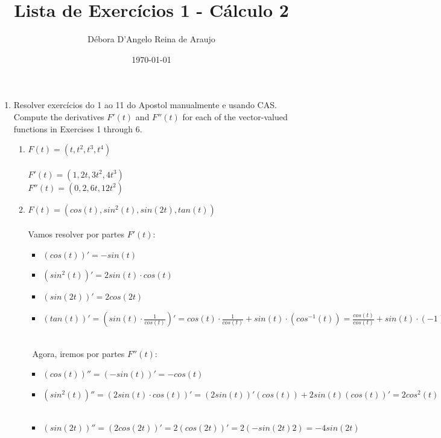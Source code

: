 \documentclass{article}
\begin{document}
\title{Lista de Exercícios 1 - Cálculo 2}
\author{Débora D'Angelo Reina de Araujo}
\date{\today}

\maketitle

\begin{enumerate}
    \item Resolver exercícios do 1 ao 11 do Apostol manualmente e usando CAS. \\
    Compute the derivatives $F'(t)$ and $F''(t)$ for each of the vector-valued functions in Exercises 1 through 6. \
        \begin{enumerate}[label=1.\arabic*.]
            \item $F(t) = (t, t^2, t^3, t^4)$ \\
                \\
                $F'(t) = (1, 2t, 3t^2, 4t^3)$ \\
                $F''(t) = (0, 2, 6t, 12t^2)$ \\
            \item $F(t) = (cos(t), sin^2(t), sin(2t), tan(t))$ \\
                \\
                Vamos resolver por partes $F'(t)$: \
                \begin{itemize}
                    \item $(cos(t))' = -sin(t)$ \
                    \item $(sin^2(t))'= 2sin(t) \cdot cos(t)$ \
                    \item $(sin(2t))' = 2cos(2t)$ \
                    \item $(tan(t))' = (sin(t) \cdot \frac{1}{cos(t)})' = cos(t) \cdot \frac{1}{cos(t)} + sin(t) \cdot (cos^{-1}(t)) = \frac{cos(t)}{cos(t)} + sin(t) \cdot (-1)(cos^{-2}(t))(-sin(t)) = \frac{cos^2(t)}{cos^2(t)} + \frac{sin^2(t)}{cos^2(t)} = \frac{1}{cos^2(t)} = sec^2(t) $ \
                \end{itemize} \
                Agora, iremos por partes $F''(t)$: \
                \begin{itemize}
                    \item $(cos(t))'' = (-sin(t))' = -cos(t)$ \
                    \item $(sin^2(t))''= (2sin(t) \cdot cos(t))' = (2sin(t))'(cos(t)) + 2sin(t)(cos(t))' = 2cos^2(t) - 2sin^2(t) $ \
                    \item $(sin(2t))'' = (2cos(2t))' = 2(cos(2t))' = 2(-sin(2t)2) = -4sin(2t)$ \

\end{itemize}
\end{enumerate}
\end{enumerate}
\end{document}
